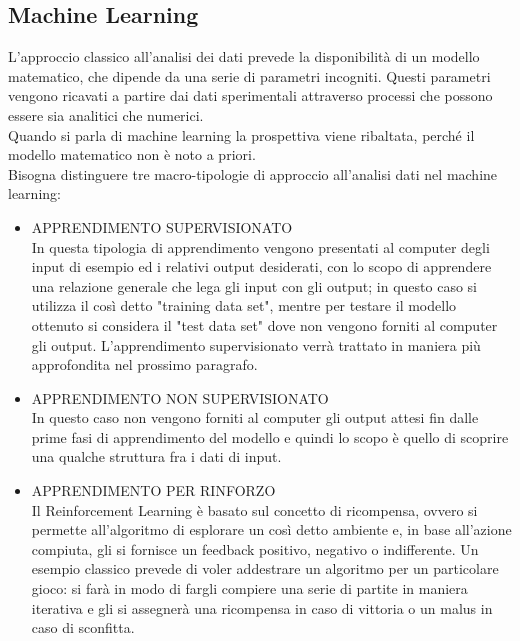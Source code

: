 \subsection{Machine Learning}
\label{subsec:machine learning}
	L'approccio classico all'analisi dei dati prevede la disponibilità di un modello matematico, che dipende da una serie di parametri incogniti. Questi parametri vengono ricavati a partire dai dati sperimentali attraverso processi che possono essere sia analitici che numerici. \\
	Quando si parla di machine learning la prospettiva viene ribaltata, perché il modello matematico non è noto a priori. \\
	Bisogna distinguere tre macro-tipologie di approccio all'analisi dati nel machine learning:
	\begin{itemize}
		\item APPRENDIMENTO SUPERVISIONATO \\
			In questa tipologia di apprendimento vengono presentati al computer degli input di esempio ed i relativi output desiderati, con lo scopo di apprendere una relazione generale che lega gli input con gli output; in questo caso si utilizza il così detto "training data set", mentre per testare il modello ottenuto si considera il "test data set" dove non vengono forniti al computer gli output. L'apprendimento supervisionato verrà trattato in maniera più approfondita nel prossimo paragrafo.
		\item APPRENDIMENTO NON SUPERVISIONATO \\
			In questo caso non vengono forniti al computer gli output attesi fin dalle prime fasi di apprendimento del modello e quindi lo scopo è quello di scoprire una qualche struttura fra i dati di input.
		\item APPRENDIMENTO PER RINFORZO \\
			Il Reinforcement Learning è basato sul concetto di ricompensa, ovvero si permette all'algoritmo di esplorare un così detto ambiente e, in base all'azione compiuta, gli si fornisce un feedback positivo, negativo o indifferente. Un esempio classico prevede di voler addestrare un algoritmo per un particolare gioco: si farà in modo di fargli compiere una serie di partite in maniera iterativa e gli si assegnerà una ricompensa in caso di vittoria o un malus in caso di sconfitta. \\ 
	\end{itemize}

